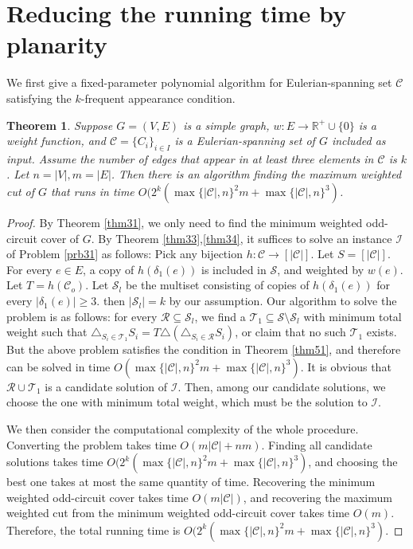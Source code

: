 \documentclass[10pt,fleqn]{article}
\newtheorem{theorem}{Theorem}[section]
\newcommand{\R}{\mathbb{R}}
\newcommand{\rs}{\setminus}
\newcommand{\mc}[1]{\mathcal{#1}}
\begin{document}
	\section{Reducing the running time by planarity} \label{s6}
	We first give a fixed-parameter polynomial algorithm for Eulerian-spanning set $\mc{C}$ satisfying the $k$-frequent appearance condition.
	\begin{theorem}\label{thm52}
		Suppose $G=(V,E)$ is a simple graph, $w:E\to\R^+\cup\{0\}$ is a weight function, and $\mc{C}=\{C_i\}_{i\in I}$ is a Eulerian-spanning set of $G$ included as input. Assume the number of edges that appear in at least three elements in $\mc{C}$ is $k$. Let $n=|V|,m=|E|$. Then there is an algorithm finding the maximum weighted cut of $G$ that runs in time $O(2^k(\max\{|\mc{C}|,n\}^2m+\max\{|\mc{C}|,n\}^3)$.
	\end{theorem}
	\begin{proof}
		By Theorem \ref{thm31}, we only need to find the minimum weighted odd-circuit cover of $G$. By Theorem \ref{thm33},\ref{thm34}, it suffices to solve an instance $\mc{I}$ of Problem \ref{prb31} as follows: Pick any bijection $h:\mc{C}\to[|\mc{C}|]$. Let $S=[|\mc{C}|]$. For every $e\in E$, a copy of $h(\delta_1(e))$ is included in $\mc{S}$, and weighted by $w(e)$. Let $T=h(\mc{C}_o)$. Let $\mc{S}_l$ be the multiset consisting of copies of $h(\delta_1(e))$ for every $|\delta_1(e)|\geq 3$. then $|\mc{S}_l|=k$ by our assumption. Our algorithm to solve the problem is as follows: for every $\mc{R}\subseteq\mc{S}_l$, we find a $\mc{T}_1\subseteq\mc{S}\rs\mc{S}_l$ with minimum total weight such that $\triangle_{S_i\in\mc{T}_1}S_i=T\triangle(\triangle_{S_i\in\mc{R}}S_i)$, or claim that no such $\mc{T}_1$ exists. But the above problem satisfies the condition in Theorem \ref{thm51}, and therefore can be solved in time $O(\max\{|\mc{C}|,n\}^2m+\max\{|\mc{C}|,n\}^3)$. It is obvious that $\mc{R}\cup\mc{T}_1$ is a candidate solution of $\mc{I}$. Then, among our candidate solutions, we choose the one with minimum total weight, which must be the solution to $\mc{I}$. \par
		We then consider the computational complexity of the whole procedure. Converting the problem takes time $O(m|\mc{C}|+nm)$. Finding all candidate solutions takes time $O(2^k(\max\{|\mc{C}|,n\}^2m+\max\{|\mc{C}|,n\}^3)$, and choosing the best one takes at most the same quantity of time. Recovering the minimum weighted odd-circuit cover takes time $O(m|\mc{C}|)$, and recovering the maximum weighted cut from the minimum weighted odd-circuit cover takes time $O(m)$. Therefore, the total running time is $O(2^k(\max\{|\mc{C}|,n\}^2m+\max\{|\mc{C}|,n\}^3)$.
	\end{proof} \par
\end{document}
